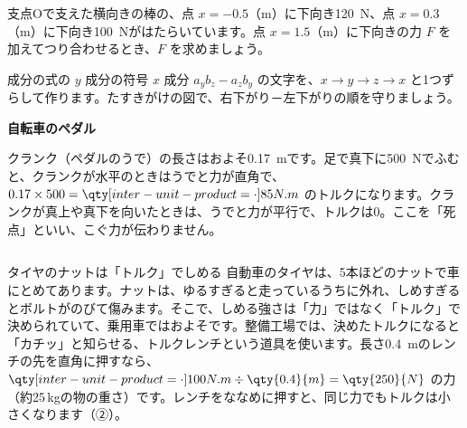 \begin{jibun}
支点Oで支えた横向きの棒の、点 $x=-0.5$（m）に下向き\qty{120}{N}、点 $x=0.3$（m）に下向き\qty{100}{N}がはたらいています。点 $x=1.5$（m）に下向きの力 $F$ を加えてつり合わせるとき、$F$ を求めましょう。
\end{jibun}

\begin{tsumazuki}{成分の式の $y$ 成分の符号}
$x$ 成分 $a_yb_z-a_zb_y$ の文字を、$x\to y\to z\to x$ と1つずらして作ります。たすきがけの図で、右下がり－左下がりの順を守りましょう。
\end{tsumazuki}

\begin{butsuri}
\noindent\begin{minipage}[c]{0.62\linewidth}
\textbf{自転車のペダル}\par\noindent クランク（ペダルのうで）の長さはおよそ\qty{0.17}{m}です。足で真下に\qty{500}{N}でふむと、クランクが水平のときはうでと力が直角で、$0.17\times500=\bkivoNm{85}$ のトルクになります。クランクが真上や真下を向いたときは、うでと力が平行で、トルクは0。ここを「死点」といい、こぐ力が伝わりません。
\end{minipage}\hfill
\begin{minipage}[c]{0.35\linewidth}
\centering
{}
\end{minipage}
\end{butsuri}

\begin{column}{タイヤのナットは「トルク」でしめる}
自動車のタイヤは、5本ほどのナットで車にとめてあります。ナットは、ゆるすぎると走っているうちに外れ、しめすぎるとボルトがのびて傷みます。そこで、しめる強さは「力」ではなく「トルク」で決められていて、乗用車ではおよそです。整備工場では、決めたトルクになると「カチッ」と知らせる、トルクレンチという道具を使います。長さ\qty{0.4}{m}のレンチの先を直角に押すなら、$\bkivoNm{100}\div\qty{0.4}{m}=\qty{250}{N}$ の力（約25\,kgの物の重さ）です。レンチをななめに押すと、同じ力でもトルクは小さくなります（②）。
\end{column}


